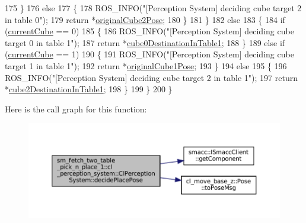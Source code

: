 \begin{DoxyCode}
175             \}
176             \textcolor{keywordflow}{else}
177             \{
178                 ROS\_INFO(\textcolor{stringliteral}{"[Perception System] deciding cube target 2 in table 0"});
179                 \textcolor{keywordflow}{return} *\hyperlink{classsm__fetch__two__table__pick__n__place__1_1_1cl__perception__system_1_1ClPerceptionSystem_a25eb595d1c9f8256f4bd5ae1ac3d5651}{originalCube2Pose};
180             \}
181         \}
182         \textcolor{keywordflow}{else}
183         \{
184             \textcolor{keywordflow}{if} (\hyperlink{classsm__fetch__two__table__pick__n__place__1_1_1cl__perception__system_1_1ClPerceptionSystem_a0acc9100f7de93d128c356fe928f311a}{currentCube} == 0)
185             \{
186                 ROS\_INFO(\textcolor{stringliteral}{"[Perception System] deciding cube target 0 in table 1"});
187                 \textcolor{keywordflow}{return} *\hyperlink{classsm__fetch__two__table__pick__n__place__1_1_1cl__perception__system_1_1ClPerceptionSystem_a4badbcb867d3baa93ddc40e73efe8d3f}{cube0DestinationInTable1};
188             \}
189             \textcolor{keywordflow}{else} \textcolor{keywordflow}{if} (\hyperlink{classsm__fetch__two__table__pick__n__place__1_1_1cl__perception__system_1_1ClPerceptionSystem_a0acc9100f7de93d128c356fe928f311a}{currentCube} == 1)
190             \{
191                 ROS\_INFO(\textcolor{stringliteral}{"[Perception System] deciding cube target 1 in table 1"});
192                 \textcolor{keywordflow}{return} *\hyperlink{classsm__fetch__two__table__pick__n__place__1_1_1cl__perception__system_1_1ClPerceptionSystem_a08c5950cef16dc2e307ec5c3573ba3f8}{originalCube1Pose};
193             \}
194             \textcolor{keywordflow}{else}
195             \{
196                 ROS\_INFO(\textcolor{stringliteral}{"[Perception System] deciding cube target 2 in table 1"});
197                 \textcolor{keywordflow}{return} *\hyperlink{classsm__fetch__two__table__pick__n__place__1_1_1cl__perception__system_1_1ClPerceptionSystem_aacd55af08e30d8b6b1303a670acd3328}{cube2DestinationInTable1};
198             \}
199         \}
200     \}
\end{DoxyCode}
Here is the call graph for this function\+:
\nopagebreak
\begin{figure}[H]
\begin{center}
\leavevmode
\includegraphics[width=350pt]{classsm__fetch__two__table__pick__n__place__1_1_1cl__perception__system_1_1ClPerceptionSystem_ac5885c03fa6f754d1b1c312f4d925066_cgraph}
\end{center}
\end{figure}
